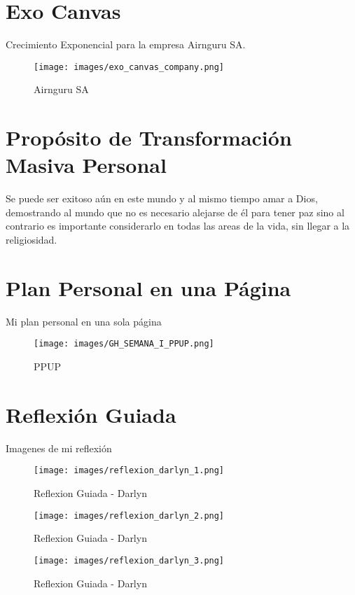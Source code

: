 \section*{Exo Canvas}
Crecimiento Exponencial para la empresa Airnguru SA.

\begin{figure}[H]
  \centering
  \texttt{[image: images/exo\_canvas\_company.png]}
  \caption{Airnguru SA}
  \label{fig:exo_canvas_company}
\end{figure}


\section*{Propósito de Transformación Masiva Personal}
Se puede ser exitoso aún en este mundo y al mismo tiempo amar a Dios, demostrando
al mundo que no es necesario alejarse de él para tener paz sino al contrario es
importante considerarlo en todas las areas de la vida, sin llegar a la religiosidad.

\section*{Plan Personal en una Página}
Mi plan personal en una sola página

\begin{figure}[H]
  \centering
  \texttt{[image: images/GH\_SEMANA\_I\_PPUP.png]}
  \caption{PPUP}
  \label{fig:ppup_darlyn}
\end{figure}

\section*{Reflexión Guiada}
Imagenes de mi reflexión

\begin{figure}[H]
  \centering
  \texttt{[image: images/reflexion\_darlyn\_1.png]}
  \caption{Reflexion Guiada - Darlyn}
  \label{fig:reflexion_darlyn_1}
\end{figure}

\begin{figure}[H]
  \centering
  \texttt{[image: images/reflexion\_darlyn\_2.png]}
  \caption{Reflexion Guiada - Darlyn}
  \label{fig:reflexion_darlyn_2}
\end{figure}

\begin{figure}[H]
  \centering
  \texttt{[image: images/reflexion\_darlyn\_3.png]}
  \caption{Reflexion Guiada - Darlyn}
  \label{fig:reflexion_darlyn_3}
\end{figure}


